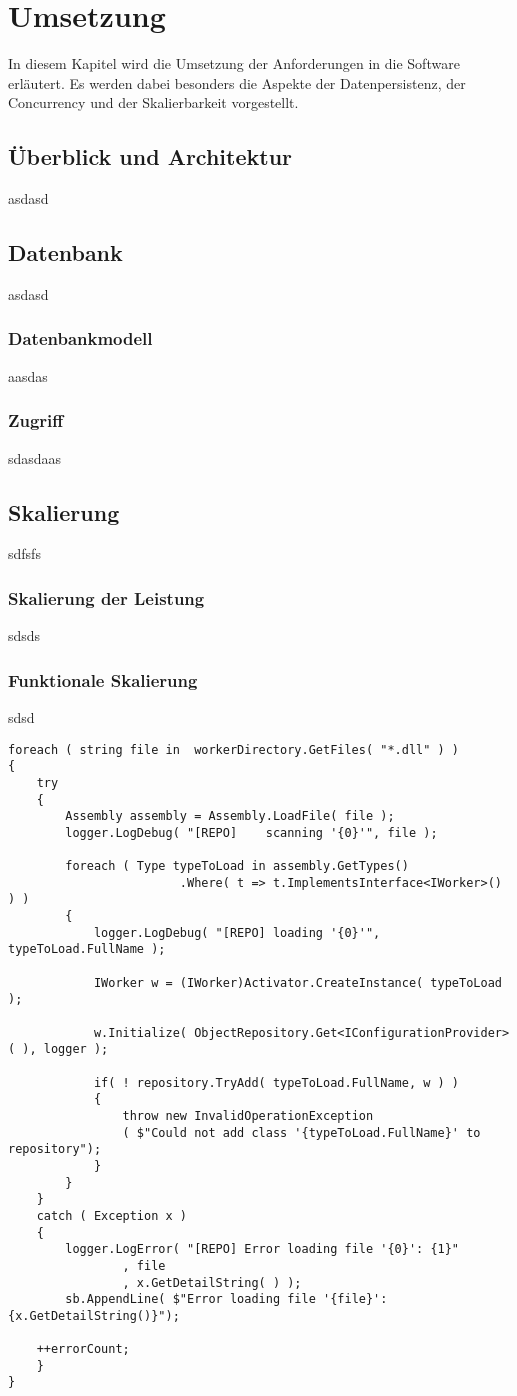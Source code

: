 \chapter{Umsetzung}\label{chap:Umsetzung}
\chapterstart
In diesem Kapitel wird die Umsetzung der Anforderungen in die Software erläutert. Es werden dabei besonders die Aspekte der Datenpersistenz, der Concurrency und der Skalierbarkeit vorgestellt.
\section{Überblick und Architektur}
asdasd
\section{Datenbank}
asdasd
\subsection{Datenbankmodell}
aasdas
\subsection{Zugriff}
sdasdaas
\section{Skalierung}
sdfsfs
\subsection{Skalierung der Leistung}
sdsds
\subsection{Funktionale Skalierung}
sdsd
\begin{lstlisting}[caption={Dynamic Loading},label={lst:dynamicloading},captionpos=b]
foreach ( string file in  workerDirectory.GetFiles( "*.dll" ) )
{
	try
	{
		Assembly assembly = Assembly.LoadFile( file );
		logger.LogDebug( "[REPO]    scanning '{0}'", file );

		foreach ( Type typeToLoad in assembly.GetTypes()
						.Where( t => t.ImplementsInterface<IWorker>() ) )
		{
			logger.LogDebug( "[REPO] loading '{0}'", typeToLoad.FullName );

			IWorker w = (IWorker)Activator.CreateInstance( typeToLoad );

			w.Initialize( ObjectRepository.Get<IConfigurationProvider>( ), logger );

			if( ! repository.TryAdd( typeToLoad.FullName, w ) )
			{
				throw new InvalidOperationException
				( $"Could not add class '{typeToLoad.FullName}' to repository");
			}
		}
	}
	catch ( Exception x )
	{
		logger.LogError( "[REPO] Error loading file '{0}': {1}"
				, file
				, x.GetDetailString( ) );
		sb.AppendLine( $"Error loading file '{file}': {x.GetDetailString()}");

	++errorCount;
	}
}
\end{lstlisting}
